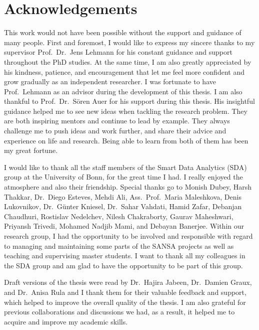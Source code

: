 \chapter*{Acknowledgements}
\label{sec:ack}
This work would not have been possible without the support and guidance of many people.
First and foremost, I would like to express my sincere thanks to my supervisor Prof.\ Dr.\ Jens Lehmann for his constant guidance and support throughout the PhD studies.
At the same time, I am also greatly appreciated by his kindness, patience, and encouragement that let me feel more confident and grow gradually as an independent researcher.
I was fortunate to have Prof.\ Lehmann as an advisor during the development of this thesis.
I am also thankful to Prof.\ Dr.\ S{\"o}ren Auer for his support during this thesis.
His insightful guidance helped me to see new ideas when tackling the research problem.
They are both inspiring mentors and continue to lead by example. 
They always challenge me to push ideas and work further, and share their advice and experience on life and research. 
Being able to learn from both of them has been my great fortune.

I would like to thank all the staff members of the Smart Data Analytics (SDA) group at the University of Bonn, for the great time I had.
I really enjoyed the atmosphere and also their friendship.
Special thanks go to Monish Dubey, Harsh Thakkar, Dr.\ Diego Esteves, Mehdi Ali, Ass.\ Prof.\ Maria Maleshkova, Denis Lukovnikov, Dr.\ G{\"{u}}nter Kniesel, Dr.\ Sahar Vahdati, Hamid Zafar, Debanjan Chaudhuri, Rostislav Nedelchev, Nilesh Chakraborty, Gaurav Maheshwari, Priyansh Trivedi, Mohamed Nadjib Mami, and Debayan Banerjee.
Within our research group, I had the opportunity to be involved and responsible with regard to managing and maintaining some parts of the SANSA projects as well as teaching and supervising master students.
I want to thank all my colleagues in the SDA group and am glad to have the opportunity to be part of this group.

Draft versions of the thesis were read by Dr.\ Hajira Jabeen, Dr.\ Damien Graux, and Dr.\ Anisa Rula and I thank them for their valuable feedback and support, which helped to improve the overall quality of the thesis.
I am also grateful for previous collaborations and discussions we had, as a result, it helped me to acquire and improve my academic skills.


